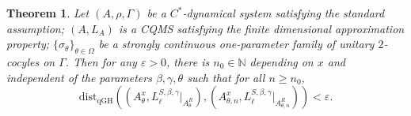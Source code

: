 \documentclass[a4paper,11pt,reqno]{amsart}
\theoremstyle{plain}
\newtheorem{thm}{Theorem}[section]
\theoremstyle{mainthmstyle}
\theoremstyle{named}
\numberwithin{equation}{section}
\begin{document}
\begin{thm} \label{fin-dim threshold}
Let $(A,\rho,\Gamma)$ be a $C^{\ast}$-dynamical system satisfying the standard assumption; $(A,L_A)$ is a CQMS satisfying the finite dimensional approximation property; $\{\sigma_{\theta}\}_{\theta\in\Omega}$ be a strongly continuous one-parameter family of unitary $2$-cocyles on $\Gamma$. Then for any $\varepsilon>0$, there is $n_{0}\in\mathbb{N}$ depending on $x$ and independent of the parameters $\beta,\gamma,\theta$ such that 
for all $n\ge n_0$, \begin{displaymath}\mathrm {dist}_{\mathrm {qGH}} \left (\left (A_{\theta}^{x}, L_{\ell}^{S, \beta, \gamma} \big \rvert_{A_{\theta}^{R}} \right ), \left (A_{\theta, n}^{x}, L_{\ell}^{S, \beta, \gamma} \big \rvert_{A_{\theta, n}^{R}} \right ) \right )<\varepsilon.\end{displaymath}
\end{thm}
\end{document}
